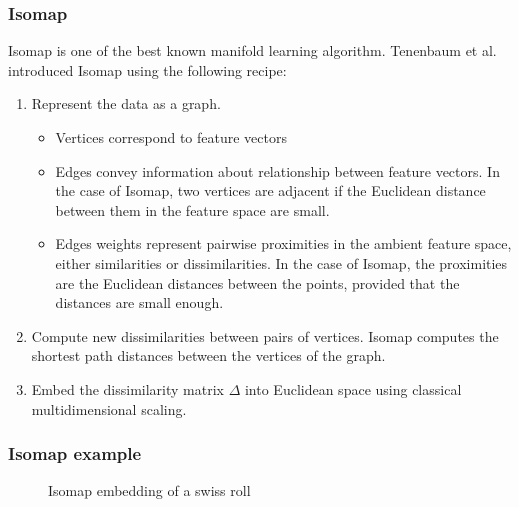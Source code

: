 \documentclass[professionalfonts, hyperref={pdfpagelabels=false,
  colorlinks=true, linkcolor=purple}]{beamer}
\begin{document}
\begin{frame}
  \frametitle{Isomap}
    Isomap is one of the best known manifold learning
    algorithm. Tenenbaum et
    al. \cite{tenebaum00:_global_geomet_framew_nonlin_dimen_reduc}
    introduced Isomap using the following recipe: 
  \begin{enumerate}
  \item Represent the data as a graph. 
    \begin{itemize}
    \item Vertices correspond to feature vectors
    \item Edges convey information about relationship between
      feature vectors. In the case of Isomap, two vertices are
      adjacent if the Euclidean distance between them in the feature
      space are small. 
    \item Edges weights represent pairwise proximities in the
      ambient feature space, either similarities or
      dissimilarities. In the case of Isomap, the proximities are the
      Euclidean distances between the points, provided that the
      distances are small enough.
    \end{itemize}
  \item Compute new dissimilarities between pairs of
    vertices. Isomap computes the shortest path distances between the
    vertices of the graph. 
  \item Embed the dissimilarity matrix $\Delta$ into Euclidean
    space using classical multidimensional scaling. 
  \end{enumerate}
\end{frame}
\begin{frame}[label=isomap_example]
  \frametitle{Isomap example}
  \subfiglabelskip=0pt
  \begin{figure}[htbp]
    \label{fig:swissroll}
    \centering
    \hspace{3pt}
    \caption{Isomap embedding of a swiss roll}
  \end{figure}
\end{frame}
\end{document}
